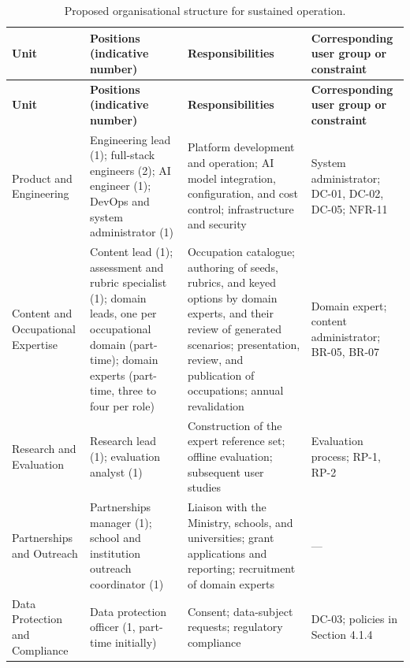 {\small
\begin{longtable}{|>{\raggedright\arraybackslash}p{}|>{\raggedright\arraybackslash}p{}|>{\raggedright\arraybackslash}p{}|>{\raggedright\arraybackslash}p{}|}
\caption{Proposed organisational structure for sustained operation.} \\
\hline
\textbf{Unit} & \textbf{Positions (indicative number)} & \textbf{Responsibilities} & \textbf{Corresponding user group or constraint} \\ \hline
\endfirsthead
\hline
\textbf{Unit} & \textbf{Positions (indicative number)} & \textbf{Responsibilities} & \textbf{Corresponding user group or constraint} \\ \hline
\endhead
Product and Engineering & Engineering lead (1); full-stack engineers (2); AI engineer (1); DevOps and system administrator (1) & Platform development and operation; AI model integration, configuration, and cost control; infrastructure and security & System administrator; DC-01, DC-02, DC-05; NFR-11 \\ \hline
Content and Occupational Expertise & Content lead (1); assessment and rubric specialist (1); domain leads, one per occupational domain (part-time); domain experts (part-time, three to four per role) & Occupation catalogue; authoring of seeds, rubrics, and keyed options by domain experts, and their review of generated scenarios; presentation, review, and publication of occupations; annual revalidation & Domain expert; content administrator; BR-05, BR-07 \\ \hline
Research and Evaluation & Research lead (1); evaluation analyst (1) & Construction of the expert reference set; offline evaluation; subsequent user studies & Evaluation process; RP-1, RP-2 \\ \hline
Partnerships and Outreach & Partnerships manager (1); school and institution outreach coordinator (1) & Liaison with the Ministry, schools, and universities; grant applications and reporting; recruitment of domain experts & --- \\ \hline
Data Protection and Compliance & Data protection officer (1, part-time initially) & Consent; data-subject requests; regulatory compliance & DC-03; policies in Section 4.1.4 \\ \hline
\end{longtable}
}

